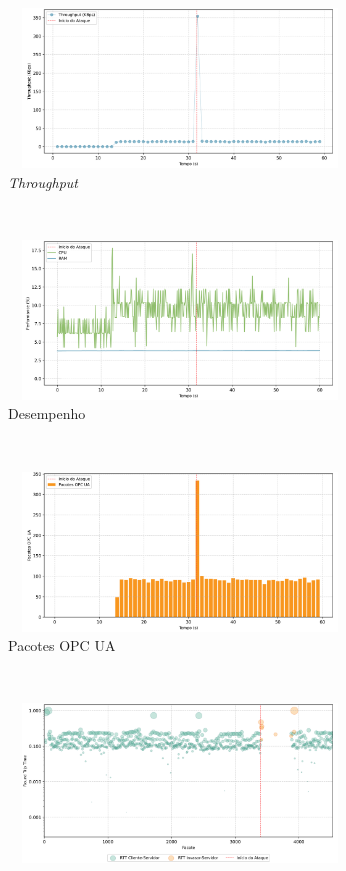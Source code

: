 \begin{apendicesenv}
\begin{figure}[htbp!]
    \centering
    \begin{subfigure}[t]{0.5\textwidth}
        \centering
        \includegraphics[width=1\textwidth, height=120pt]{USPSC-img/output/cropped/1-dos_translate_browse_path_call_stack_overflow-tput.png}
        \caption{\textit{Throughput}}
    \end{subfigure}%
    ~ 
    \begin{subfigure}[t]{0.5\textwidth}
        \centering
        \includegraphics[width=1\textwidth, height=120pt]{USPSC-img/output/cropped/1-dos_translate_browse_path_call_stack_overflow-perf.png}
        \caption{Desempenho}
    \end{subfigure}%
    \\
    \begin{subfigure}[t]{0.5\textwidth}
        \centering
        \includegraphics[width=1\textwidth, height=120pt]{USPSC-img/output/cropped/1-dos_translate_browse_path_call_stack_overflow-pack.png}
        \caption{Pacotes OPC UA}
    \end{subfigure}%
    ~
    \begin{subfigure}[t]{0.5\textwidth}
        \centering
        \includegraphics[width=1\textwidth, height=120pt]{USPSC-img/output/cropped/1-dos_translate_browse_path_call_stack_overflow-rttp.png}

\end{subfigure}
\end{figure}
\end{apendicesenv}

